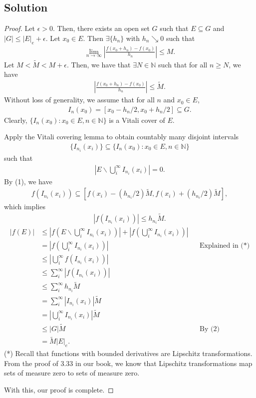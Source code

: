\documentclass[10pt,a4paper]{article}
\theoremstyle{theorem}
\theoremstyle{definition}
\begin{document}
\subsection*{Solution}
\begin{proof}
Let $\epsilon > 0$. Then, there exists an open set $G$ such that $E \subseteq G$ and $|G| \leq |E|_e + \epsilon$. Let $x_0 \in E$. Then $\exists \{h_n\}$ with $h_n \searrow 0$ such that 
\begin{align*}
 \lim_{n \to \infty} \left|\frac{f(x_0 + h_n) - f(x_0)}{h_n} \right| \leq M.
\end{align*}
Let $M < \tilde{M} < M + \epsilon$. Then, we have that $\exists N \in \mathbb{N}$ such that for all $n \geq N$, we have
\begin{align}
\left|\frac{f(x_0 + h_n) - f(x_0)}{h_n} \right| \leq \tilde{M}.
\end{align}
Without loss of generality, we assume that for all $n$ and $x_0 \in E$,
\begin{align}
I_n(x_0) = [x_0 - h_n/2, x_0 + h_n/2] \subseteq G.
\end{align}
Clearly, $\{I_n(x_0): x_0 \in E, n \in \mathbb{N}\}$ is a Vitali cover of $E$.

Apply the Vitali covering lemma to obtain countably many disjoint intervals
\begin{align*}
\{I_{n_i}(x_i)\} \subseteq \{I_n(x_0): x_0 \in E, n \in \mathbb{N}\}
\end{align*}
such that
\begin{align*}
\left| E \backslash \bigcup _i^\infty I_{n_i}(x_i) \right| = 0.
\end{align*}
By (1), we have
\begin{align*}
f(I_{n_i}(x_i)) \subseteq [f(x_i) - (h_{n_i}/2) \tilde{M}, f(x_i) + (h_{n_i}/2) \tilde{M}],
\end{align*}
which implies
\begin{align*}
|f(I_{n_i}(x_i))| \leq h_{n_i} \tilde{M}.
\end{align*}
\begin{align*}
|f(E)| &\leq \left|f\left( E \backslash \bigcup _i^\infty I_{n_i}(x_i) \right) \right| + \left| f\left(\bigcup _i^\infty I_{n_i}(x_i) \right) \right|\\
&= \left| f\left(\bigcup _i^\infty I_{n_i}(x_i) \right) \right| &&\text{Explained in (*)}\\
&\leq \left| \bigcup _i^\infty f\left(I_{n_i}(x_i) \right) \right|\\
&\leq \sum_i^\infty |f\left(I_{n_i}(x_i) \right)|\\
&\leq \sum_i^\infty h_{n_i} \tilde{M}\\
&= \sum_i^\infty|I_{n_i}(x_i)|\tilde{M}\\
&= \left| \bigcup _i^\infty I_{n_i}(x_i) \right| \tilde{M}\\
&\leq |G| \tilde{M} &&\text{By (2)}\\
&= \tilde{M}|E|_e.
\end{align*}
(*) Recall that functions with bounded derivatives are Lipschitz transformations. From the proof of 3.33 in our book, we know that Lipschitz transformations map sets of measure zero to sets of measure zero.

With this, our proof is complete.
\end{proof}
\end{document}
